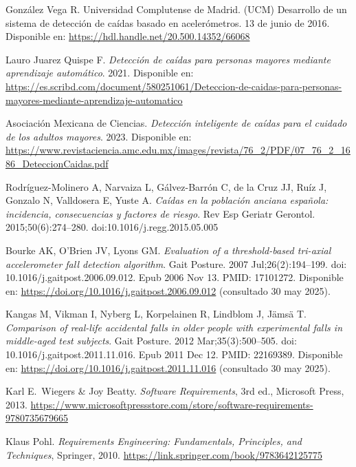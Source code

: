 \documentclass[12pt, a4paper]{article}
\begin{document}
\begin{thebibliography}{9}
	
	González Vega R. Universidad Complutense de Madrid. (UCM) 
	Desarrollo de un sistema de detección de caídas basado en acelerómetros. 13 de junio de 2016.
	Disponible en: \url{https://hdl.handle.net/20.500.14352/66068}
	
	Lauro Juarez Quispe F.
	\textit{Detección de caídas para personas mayores mediante aprendizaje automático}.
	2021.
	Disponible en: \url{https://es.scribd.com/document/580251061/Deteccion-de-caidas-para-personas-mayores-mediante-aprendizaje-automatico}
	
	Asociación Mexicana de Ciencias.
	\textit{Detección inteligente de caídas para el cuidado de los adultos mayores}.
	2023.
	Disponible en: \url{https://www.revistaciencia.amc.edu.mx/images/revista/76_2/PDF/07_76_2_1686_DeteccionCaidas.pdf}
	
	Rodríguez-Molinero A, Narvaiza L, Gálvez-Barrón C, de la Cruz JJ, Ruíz J, Gonzalo N, Valldosera E, Yuste A.
	\textit{Caídas en la población anciana española: incidencia, consecuencias y factores de riesgo}.
	Rev Esp Geriatr Gerontol. 2015;50(6):274–280.
	doi:10.1016/j.regg.2015.05.005
	
	
	Bourke AK, O'Brien JV, Lyons GM.
	\textit{Evaluation of a threshold-based tri-axial accelerometer fall detection algorithm}.
	Gait Posture. 2007 Jul;26(2):194--199. doi: 10.1016/j.gaitpost.2006.09.012. Epub 2006 Nov 13. PMID: 17101272.
	Disponible en: \url{https://doi.org/10.1016/j.gaitpost.2006.09.012} (consultado 30 may 2025).
	
	Kangas M, Vikman I, Nyberg L, Korpelainen R, Lindblom J, Jämsä T.
	\textit{Comparison of real-life accidental falls in older people with experimental falls in middle-aged test subjects}.
	Gait Posture. 2012 Mar;35(3):500--505. doi: 10.1016/j.gaitpost.2011.11.016. Epub 2011 Dec 12. PMID: 22169389.
	Disponible en: \url{https://doi.org/10.1016/j.gaitpost.2011.11.016} (consultado 30 may 2025).
	
	


	Karl E.\ Wiegers \& Joy Beatty.
	\textit{Software Requirements}, 3rd ed.,
	Microsoft Press, 2013.
	\url{https://www.microsoftpressstore.com/store/software-requirements-9780735679665}
	
	Klaus Pohl.
	\textit{Requirements Engineering: Fundamentals, Principles, and Techniques},
	Springer, 2010.
	\url{https://link.springer.com/book/9783642125775}
		

\end{thebibliography}
\end{document}
